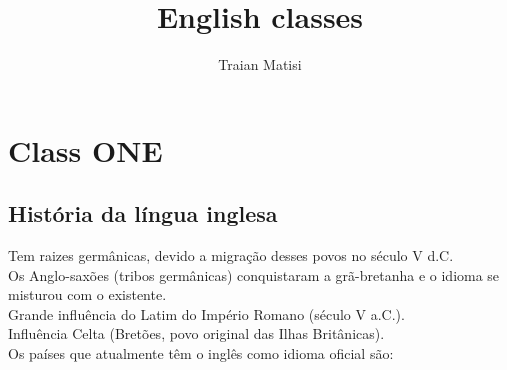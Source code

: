 \documentclass[12pt,a4paper]{article} %
\title{English classes}
\author{Traian Matisi}
\begin{document}
\maketitle
\section{Class ONE}
\subsection{História da língua inglesa}

	Tem raizes germânicas, devido a migração desses povos no século V d.C.\\
	Os Anglo-saxões (tribos germânicas) conquistaram a grã-bretanha e o idioma se misturou com o existente.\\
	Grande influência do Latim do Império Romano (século V a.C.).\\
	Influência Celta (Bretões, povo original das Ilhas Britânicas).\\
	Os países que atualmente têm o inglês como idioma oficial são:
	
\end{document}
